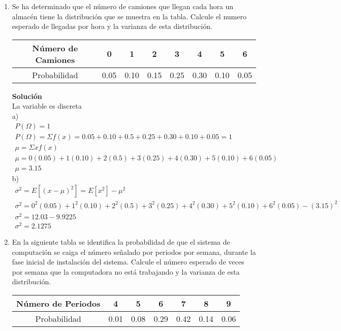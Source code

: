 \begin{enumerate}
    \item Se ha determinado que el número de camiones que llegan cada hora un almacén tiene la distribución que se muestra en la tabla. Calcule el numero esperado de llegadas por hora y la varianza de esta distribución.
    \begin{center}
        \begin{tabular}{|c|c|c|c|c|c|c|c|}
        \hline 
        Número de Camiones & 0 & 1 & 2 & 3 & 4 & 5 & 6 \\ 
        \hline 
        Probabilidad & 0.05 & 0.10 & 0.15 & 0.25 & 0.30 & 0.10 & 0.05 \\ 
        \hline 
    \end{tabular}
    \end{center}
    \textbf{Solución}\\
    La variable es discreta\\
    a)
    \begin{gather*}
    P(\Omega) = 1\\
    P(\Omega) = \Sigma f(x) = 0.05 + 0.10 + 0.5 + 0.25 +0.30 + 0.10 + 0.05 = 1\\
    \mu = \Sigma xf(x)\\
    \mu = 0(0.05) + 1(0.10) + 2(0.5) + 3(0.25) + 4(0.30) + 5(0.10) + 6(0.05)\\
    \mu = 3.15	
    \end{gather*}
    b)
    \begin{gather*}
    \sigma^2 = E[(x - \mu)^2] = E[x^2] - \mu ^2\\
    \sigma^2 = 0^2(0.05) + 1^2(0.10) + 2^2(0.5) + 3^2(0.25) + 4^2(0.30) + 5^2(0.10) + 6^2(0.05) - (3.15)^2\\
    \sigma^2 = 12.03 - 9.9225\\
    \sigma^2 = 2.1275
    \end{gather*}
    \item En la siguiente tabla se identifica la probabilidad de que el sistema de computación se caiga el número señalado por periodos por semana, durante la fase inicial de instalación del sistema. Calcule el número esperado de veces por semana que la computadora no está trabajando y la varianza de esta distribución.
    \begin{center}
    \begin{tabular}{|c|c|c|c|c|c|c|}
        \hline 
        Número de Periodos  & 4 & 5 & 6 & 7 & 8 & 9 \\ 
        \hline 
        Probabilidad & 0.01 & 0.08 & 0.29 & 0.42 & 0.14 & 0.06 \\ 

\end{tabular}
\end{center}
\end{enumerate}
